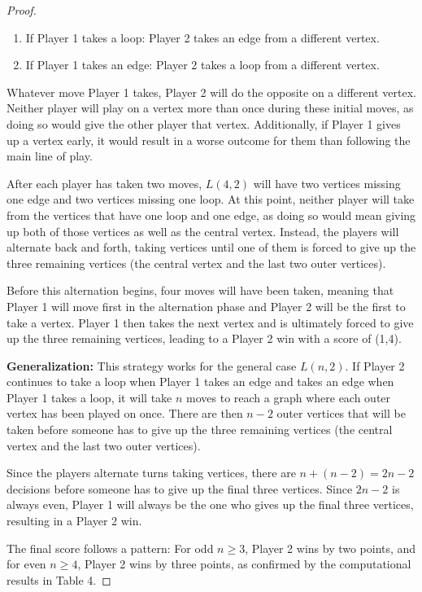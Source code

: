 \documentclass{article}
\begin{document}
\begin{proof}
\begin{enumerate}
    \item If Player 1 takes a loop: Player 2 takes an edge from a different vertex.
    \item If Player 1 takes an edge: Player 2 takes a loop from a different vertex.
\end{enumerate}

Whatever move Player 1 takes, Player 2 will do the opposite on a different vertex. Neither player will play on a vertex more than once during these initial moves, as doing so would give the other player that vertex. Additionally, if Player 1 gives up a vertex early, it would result in a worse outcome for them than following the main line of play.

After each player has taken two moves, $L(4,2)$ will have two vertices missing one edge and two vertices missing one loop. At this point, neither player will take from the vertices that have one loop and one edge, as doing so would mean giving up both of those vertices as well as the central vertex. Instead, the players will alternate back and forth, taking vertices until one of them is forced to give up the three remaining vertices (the central vertex and the last two outer vertices).

Before this alternation begins, four moves will have been taken, meaning that Player 1 will move first in the alternation phase and Player 2 will be the first to take a vertex. Player 1 then takes the next vertex and is ultimately forced to give up the three remaining vertices, leading to a Player 2 win with a score of (1,4).

\textbf{Generalization:} This strategy works for the general case $L(n,2)$. If Player 2 continues to take a loop when Player 1 takes an edge and takes an edge when Player 1 takes a loop, it will take $n$ moves to reach a graph where each outer vertex has been played on once. There are then $n - 2$ outer vertices that will be taken before someone has to give up the three remaining vertices (the central vertex and the last two outer vertices).

Since the players alternate turns taking vertices, there are $n + (n - 2) = 2n - 2$ decisions before someone has to give up the final three vertices. Since $2n - 2$ is always even, Player 1 will always be the one who gives up the final three vertices, resulting in a Player 2 win.

The final score follows a pattern: For odd $n \geq 3$, Player 2 wins by two points, and for even $n \geq 4$, Player 2 wins by three points, as confirmed by the computational results in Table 4.
\end{proof}
\end{document}
